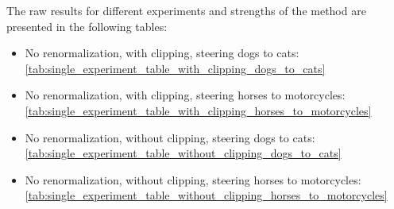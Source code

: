The raw results for different experiments and strengths of the method are presented in the following tables:
\begin{itemize}
    \item No renormalization, with clipping, steering dogs to cats: \ref{tab:single_experiment_table_with_clipping_dogs_to_cats}

    \item No renormalization, with clipping, steering horses to motorcycles: \ref{tab:single_experiment_table_with_clipping_horses_to_motorcycles}

    \item No renormalization, without clipping, steering dogs to cats: \ref{tab:single_experiment_table_without_clipping_dogs_to_cats}

    \item No renormalization, without clipping, steering horses to motorcycles: \ref{tab:single_experiment_table_without_clipping_horses_to_motorcycles}
\end{itemize}



